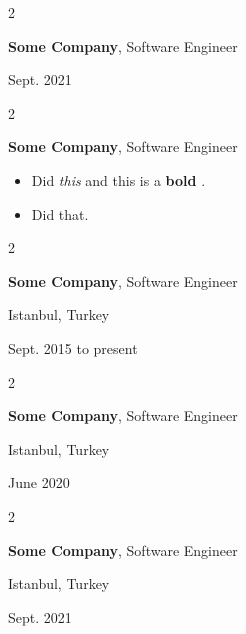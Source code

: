 \documentclass[10pt, letterpaper]{article}
\newenvironment{highlights}{
    \begin{itemize}[
        topsep=0.10 cm,
        parsep=0.10 cm,
        partopsep=0pt,
        itemsep=0pt,
        leftmargin=0.4 cm + 10pt
    ]
}{
    \end{itemize}
            
    \vspace{-0.10cm}
} %
\newenvironment{twocolentry}[2][]{
    \onecolentry
    \def\secondColumn{#2}
    \setcolumnwidth{\fill, 4.1 cm}
    \begin{paracol}{2}
}{
    \switchcolumn \raggedleft \secondColumn
    \end{paracol}
    \endonecolentry
} %
\let\hrefWithoutArrow\href
\renewcommand{\href}[2]{\hrefWithoutArrow{#1}{\mbox{\ifthenelse{\equal{#2}{}}{ }{#2 }\raisebox{.15ex}{\footnotesize \faExternalLink*}}}}
\begin{document}
        \vspace{0.2 cm}

        \begin{twocolentry}{
            Sept. 2021
        }
            \textbf{Some \textnormal{Company}}, Software Engineer
        \end{twocolentry}


        \vspace{0.2 cm}

        \begin{twocolentry}{
            
        }
            \textbf{Some \textnormal{Company}}, Software Engineer
            \begin{highlights}
                \item Did \textit{this} and this is a \textbf{bold} \href{https://example.com}{link}.
                \item Did that.
            \end{highlights}
        \end{twocolentry}


        \vspace{0.2 cm}

        \begin{twocolentry}{
            Istanbul, Turkey

        Sept. 2015 to present
        }
            \textbf{Some \textnormal{Company}}, Software Engineer
        \end{twocolentry}


        \vspace{0.2 cm}

        \begin{twocolentry}{
            Istanbul, Turkey

        June 2020
        }
            \textbf{Some \textnormal{Company}}, Software Engineer
        \end{twocolentry}


        \vspace{0.2 cm}

        \begin{twocolentry}{
            Istanbul, Turkey

        Sept. 2021
        }
            \textbf{Some \textnormal{Company}}, Software Engineer
        \end{twocolentry}


        \vspace{0.2 cm}
\end{document}
